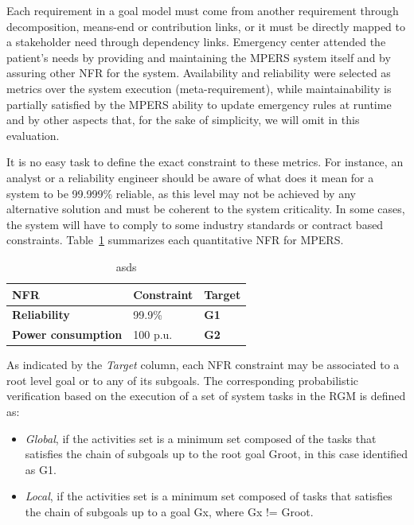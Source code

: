 Each requirement in a goal model must come from another requirement through decomposition, means-end or contribution links, or it must be directly mapped to a stakeholder need through dependency links. Emergency center attended the patient's needs by providing and maintaining the MPERS system itself and by assuring other NFR for the system. Availability and reliability were selected as metrics over the system execution (meta-requirement), while maintainability is partially satisfied by the MPERS ability to update emergency rules at runtime and by other aspects that, for the sake of simplicity, we will omit in this evaluation.

It is no easy task to define the exact constraint to these metrics. For instance, an analyst or a reliability engineer should be aware of what does it mean for a system to be 99.999\% reliable, as this level may not be achieved by any alternative solution and must be coherent to the system criticality. In some cases, the system will have to comply to some industry standards or contract based constraints. Table~\ref{tab:MPERS_NFR_C} summarizes each quantitative NFR for MPERS.
\medskip

\begin{table}[h]\label{tab:MPERS_NFR_C}
{\renewcommand{\arraystretch}{1.5}
\begin{tabularx}{\textwidth}{@{}XXX@{}}
\toprule
\textbf{NFR}               & \textbf{Constraint} & \textbf{Target}        \\ \midrule
\textbf{Reliability}       & 99.9\%            & \textbf{G1} \\
\textbf{Power consumption} & 100 p.u.            & \textbf{G2}          \\ \bottomrule
\end{tabularx}
}
\caption{asds}
\end{table}


As indicated by the \textit{Target} column, each NFR constraint may be associated to a root level goal or to any of its subgoals. The corresponding probabilistic verification based on the execution of a set of system tasks in the RGM is defined as:

\begin{itemize}

\item \textit{Global}, if the activities set is a minimum set composed of the tasks that satisfies the chain of subgoals up to the root goal Groot, in this case identified as G1.
\medskip

\item \textit{Local}, if the activities set is a minimum set composed of tasks that satisfies the chain of subgoals up to a goal Gx, where Gx != Groot.
\medskip

\end{itemize}

